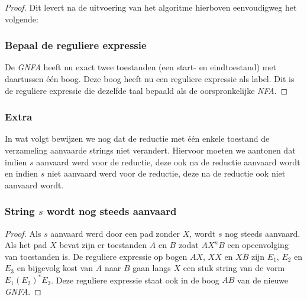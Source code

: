 \begin{proof}
\begin{minipage}{.5\textwidth}
\end{minipage}

Dit levert na de uitvoering van het algoritme hierboven eenvoudigweg het volgende:
\begin{figure}[H]
\center
{}
\end{figure}

\subsubsection*{Bepaal de reguliere expressie}
De \emph{GNFA} heeft nu exact twee toestanden (een start- en eindtoestand) met daartussen \'e\'en boog. Deze boog heeft nu een reguliere expressie als label. Dit is de reguliere expressie die dezelfde taal bepaald als de oorspronkelijke \emph{NFA}.
\end{proof}

\subsubsection*{Extra}
In wat volgt bewijzen we nog dat de reductie met \'e\'en enkele toestand de verzameling aanvaarde strings niet verandert. Hiervoor moeten we aantonen dat indien $s$ aanvaard werd voor de reductie, deze ook na de reductie aanvaard wordt en indien $s$ niet aanvaard werd voor de reductie, deze na de reductie ook niet aanvaard wordt.\\
\subsubsection*{String $s$ wordt nog steeds aanvaard}
\begin{proof}
Als $s$ aanvaard werd door een pad zonder $X$, wordt $s$ nog steeds aanvaard. Als het pad $X$ bevat zijn er toestanden $A$ en $B$ zodat $AX^nB$ een opeenvolging van toestanden is. De reguliere expressie op bogen $AX$, $XX$ en $XB$ zijn $E_1$, $E_2$ en $E_3$ en bijgevolg kost van $A$ naar $B$ gaan langs $X$ een stuk string van de vorm $E_1  (E_2)^* E_3$. Deze reguliere expressie staat ook in de boog $AB$ van de nieuwe \emph{GNFA}.
\end{proof}
